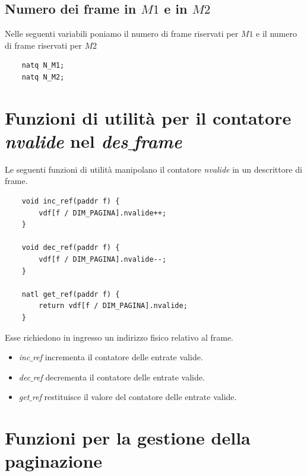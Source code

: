\subsection{Numero dei frame in $M1$ e in $M2$} 
Nelle seguenti variabili poniamo il numero di frame riservati per $M1$ e il numero di frame riservati per $M2$
\begin{verbatim}
	natq N_M1;
	natq N_M2;
\end{verbatim}

\section{Funzioni di utilità per il contatore \emph{nvalide} nel \emph{des$\_$frame}}
Le seguenti funzioni di utilità manipolano il contatore \emph{nvalide} in un descrittore di frame. 
\small 
\begin{verbatim}
	void inc_ref(paddr f) {
		vdf[f / DIM_PAGINA].nvalide++;
	}
	
	void dec_ref(paddr f) {
		vdf[f / DIM_PAGINA].nvalide--;
	}
	
	natl get_ref(paddr f) {
		return vdf[f / DIM_PAGINA].nvalide;
	}
\end{verbatim}
\normalsize 
Esse richiedono in ingresso un indirizzo fisico relativo al  frame.
\begin{itemize}
	\item \emph{inc$\_$ref} incrementa il contatore delle entrate valide.
	\item \emph{dec$\_$ref} decrementa il contatore delle entrate valide.
	\item \emph{get$\_$ref} restituisce il valore del contatore delle entrate valide.
\end{itemize}

\section{Funzioni per la gestione della paginazione}
